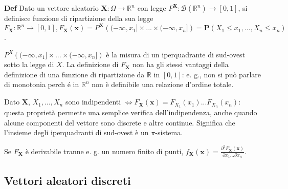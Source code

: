 \documentclass{article}
\begin{document}
\textbf{Def} Dato un vettore aleatorio $\mathbf{X}:\Omega \rightarrow 
\mathbb{R}
^{n}$ con legge $P^{\mathbf{X}}:\mathcal{B}\left( 
\mathbb{R}
^{n}\right) \rightarrow \left[ 0,1\right] $, si definisce funzione di
ripartizione della sua legge $F_{\mathbf{X}}:%
\mathbb{R}
^{n}\rightarrow \left[ 0,1\right] ,F_{\mathbf{X}}\left( \mathbf{x}\right)
=P^{\mathbf{X}}\left( (-\infty ,x_{1}]\times ...\times (-\infty
,x_{n}]\right) =\mathbf{P}\left( X_{1}\leq x_{1},...,X_{n}\leq x_{n}\right) $%
.

$P^{X}\left( (-\infty ,x_{1}]\times ...\times (-\infty ,x_{n}]\right) $ \`{e}
la misura di un iperquadrante di sud-ovest sotto la legge di $X$. La
definizione di $F_{\mathbf{X}}$ non ha gli stessi vantaggi della definizione
di una funzione di ripartizione da $%
\mathbb{R}
$ in $\left[ 0,1\right] $: e. g., non si pu\`{o} parlare di monotonia perch%
\'{e} in $%
\mathbb{R}
^{n}$ non \`{e} definibile una relazione d'ordine totale.

Dato $\mathbf{X}$, $X_{1},...,X_{n}$ sono indipendenti $\Longleftrightarrow
F_{\mathbf{X}}\left( \mathbf{x}\right) =F_{X_{1}}\left( x_{1}\right)
...F_{X_{n}}\left( x_{n}\right) $: questa propriet\`{a} permette una
semplice verifica dell'indipendenza, anche quando alcune componenti del
vettore sono discrete e altre continue. Significa che l'insieme degli
iperquadranti di sud-ovest \`{e} un $\pi $-sistema.

Se $F_{\mathbf{X}}$ \`{e} derivabile tranne e. g. un numero finito di punti, 
$f_{\mathbf{X}}\left( \mathbf{x}\right) =\frac{\partial ^{2}F_{\mathbf{X}%
}\left( \mathbf{x}\right) }{\partial x_{1}...\partial x_{n}}$.

\subsection{Vettori aleatori discreti}
\end{document}
